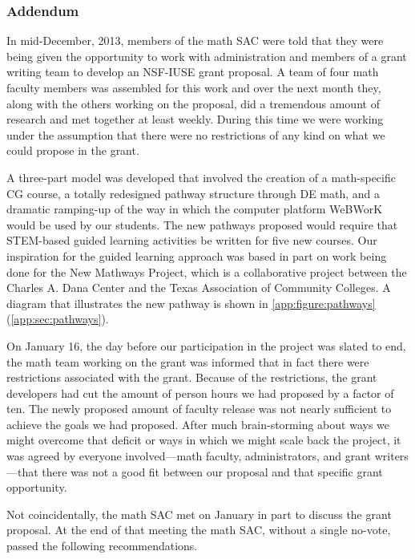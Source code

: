 \subsubsection{Addendum}\label{over:subsub:nsfiuse}
In mid-December, 2013, members of the math SAC were told that they were being
given the opportunity to work with administration and members of a grant writing
team to develop an NSF-IUSE grant proposal.  A team of four math faculty members
was assembled for this work and over the next month they, along with the others
working on the proposal, did a tremendous amount of research and met together at
least weekly.  During this time we were working under the assumption that there
were no restrictions of any kind on what we could propose in the grant.

A three-part model was developed that involved the creation of a math-specific
CG course, a totally redesigned pathway structure through DE math, and a
dramatic ramping-up of the way in which the computer platform WeBWorK would be
used by our students.  The new pathways proposed would require that STEM-based
guided learning activities be written for five new courses.  Our inspiration for
the guided learning approach was based in part on work being done for the New
Mathways Project,  which is a collaborative project between the Charles A. Dana
Center and the Texas Association of Community Colleges. A diagram that
illustrates the new pathway is shown in \cref{app:figure:pathways}
(\vref{app:sec:pathways}).

On January 16, the day before our participation in the project was slated to
end, the math team working on the grant was informed that in fact there were
restrictions associated with the grant.  Because of the restrictions, the grant
developers had cut the amount of person hours we had proposed by a factor of
ten.  The newly proposed amount of faculty release was not nearly sufficient to
achieve the goals we had proposed.  After much brain-storming about ways we
might overcome that deficit or ways in which we might scale back the project, it
was agreed by everyone involved---math faculty, administrators, and grant
writers---that there was not a good fit between our proposal and that specific
grant opportunity.

Not coincidentally, the math SAC met on January  in part to discuss the grant
proposal.  At the end of that meeting the math SAC, without a single no-vote,
passed the following recommendations.


